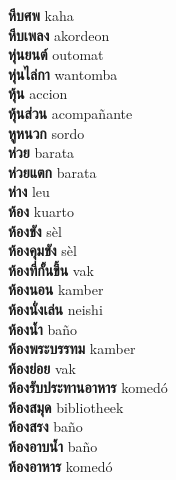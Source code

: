 \textbf{ หีบศพ  } kaha \\
\textbf{ หีบเพลง  } akordeon \\
\textbf{ หุ่นยนต์  } outomat \\
\textbf{ หุ่นไล่กา  } wantomba \\
\textbf{ หุ้น  } accion \\
\textbf{ หุ้นส่วน  } acompañante \\
\textbf{ หูหนวก  } sordo \\
\textbf{ ห่วย  } barata \\
\textbf{ ห่วยแตก  } barata \\
\textbf{ ห่าง  } leu \\
\textbf{ ห้อง  } kuarto \\
\textbf{ ห้องขัง  } sèl \\
\textbf{ ห้องคุมขัง  } sèl \\
\textbf{ ห้องที่กั้นขึ้น  } vak \\
\textbf{ ห้องนอน  } kamber \\
\textbf{ ห้องนั่งเล่น  } neishi \\
\textbf{ ห้องน้ำ  } baño \\
\textbf{ ห้องพระบรรทม  } kamber \\
\textbf{ ห้องย่อย  } vak \\
\textbf{ ห้องรับประทานอาหาร  } komedó \\
\textbf{ ห้องสมุด  } bibliotheek \\
\textbf{ ห้องสรง  } baño \\
\textbf{ ห้องอาบน้ำ  } baño \\
\textbf{ ห้องอาหาร  } komedó \\
